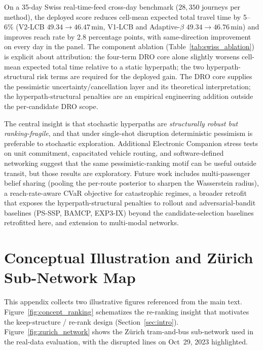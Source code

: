 \documentclass[11pt]{article}
\theoremstyle{definition}
\theoremstyle{remark}
\begin{document}
On a 35-day Swiss real-time-feed cross-day benchmark ($28{,}350$ journeys per method), the deployed score reduces cell-mean expected total travel time by 5--6\% (V2-LCB $49.34\!\to\!46.47$\,min, V1-LCB and Adaptive-$\beta$ $49.34\!\to\!46.76$\,min) and improves reach rate by 2.8 percentage points, with same-direction improvement on every day in the panel. The component ablation (Table~\ref{tab:swiss_ablation}) is explicit about attribution: the four-term DRO core alone slightly worsens cell-mean expected total time relative to a static hyperpath; the two hyperpath-structural risk terms are required for the deployed gain. The DRO core supplies the pessimistic uncertainty/cancellation layer and its theoretical interpretation; the hyperpath-structural penalties are an empirical engineering addition outside the per-candidate DRO scope.

The central insight is that stochastic hyperpaths are \emph{structurally robust but ranking-fragile}, and that under single-shot disruption deterministic pessimism is preferable to stochastic exploration. Additional Electronic Companion stress tests on unit commitment, capacitated vehicle routing, and software-defined networking suggest that the same pessimistic-ranking motif can be useful outside transit, but those results are exploratory.
Future work includes multi-passenger belief sharing (pooling the per-route posterior to sharpen the Wasserstein radius), a reach-rate-aware CVaR objective for catastrophic regimes, a broader retrofit that exposes the hyperpath-structural penalties to rollout and adversarial-bandit baselines (PS-SSP, BAMCP, EXP3-IX) beyond the candidate-selection baselines retrofitted here, and extension to multi-modal networks.

\appendix

\section{Conceptual Illustration and Z\"urich Sub-Network Map}
\label{app:figs}

This appendix collects two illustrative figures referenced from the
main text. Figure~\ref{fig:concept_ranking} schematizes the
re-ranking insight that motivates the keep-structure / re-rank
design (Section~\ref{sec:intro}). Figure~\ref{fig:zurich_network}
shows the Z\"urich tram-and-bus sub-network used in the real-data
evaluation, with the disrupted lines on Oct~29, 2023 highlighted.
\end{document}
